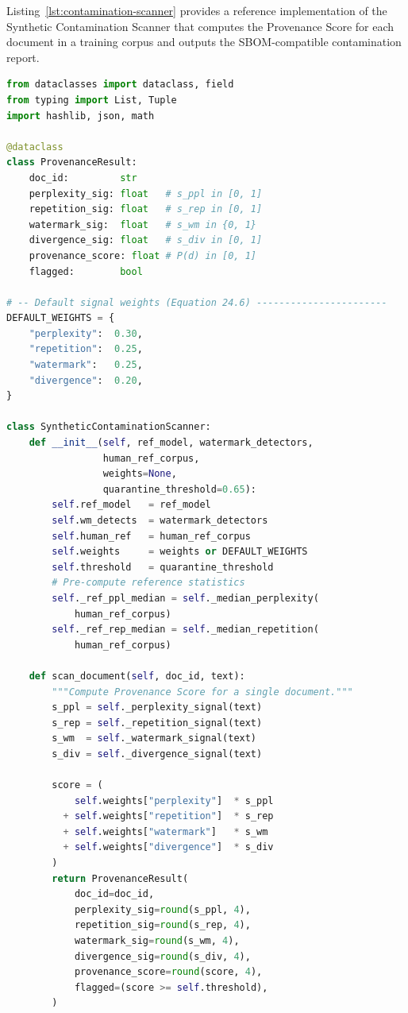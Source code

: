Listing~\ref{lst:contamination-scanner} provides a reference
implementation of the Synthetic Contamination Scanner that
computes the Provenance Score for each document in a training
corpus and outputs the SBOM-compatible contamination report.

\begin{lstlisting}[language=Python, style=pythonstyle,
  caption={Synthetic Contamination Scanner: computes per-document
           Provenance Scores and generates SBOM-compatible
           contamination reports for AI training pipelines.},
  label={lst:contamination-scanner}
]
from dataclasses import dataclass, field
from typing import List, Tuple
import hashlib, json, math

@dataclass
class ProvenanceResult:
    doc_id:         str
    perplexity_sig: float   # s_ppl in [0, 1]
    repetition_sig: float   # s_rep in [0, 1]
    watermark_sig:  float   # s_wm in {0, 1}
    divergence_sig: float   # s_div in [0, 1]
    provenance_score: float # P(d) in [0, 1]
    flagged:        bool

# -- Default signal weights (Equation 24.6) -----------------------
DEFAULT_WEIGHTS = {
    "perplexity":  0.30,
    "repetition":  0.25,
    "watermark":   0.25,
    "divergence":  0.20,
}

class SyntheticContaminationScanner:
    def __init__(self, ref_model, watermark_detectors,
                 human_ref_corpus,
                 weights=None,
                 quarantine_threshold=0.65):
        self.ref_model   = ref_model
        self.wm_detects  = watermark_detectors
        self.human_ref   = human_ref_corpus
        self.weights     = weights or DEFAULT_WEIGHTS
        self.threshold   = quarantine_threshold
        # Pre-compute reference statistics
        self._ref_ppl_median = self._median_perplexity(
            human_ref_corpus)
        self._ref_rep_median = self._median_repetition(
            human_ref_corpus)

    def scan_document(self, doc_id, text):
        """Compute Provenance Score for a single document."""
        s_ppl = self._perplexity_signal(text)
        s_rep = self._repetition_signal(text)
        s_wm  = self._watermark_signal(text)
        s_div = self._divergence_signal(text)

        score = (
            self.weights["perplexity"]  * s_ppl
          + self.weights["repetition"]  * s_rep
          + self.weights["watermark"]   * s_wm
          + self.weights["divergence"]  * s_div
        )
        return ProvenanceResult(
            doc_id=doc_id,
            perplexity_sig=round(s_ppl, 4),
            repetition_sig=round(s_rep, 4),
            watermark_sig=round(s_wm, 4),
            divergence_sig=round(s_div, 4),
            provenance_score=round(score, 4),
            flagged=(score >= self.threshold),
        )


\end{lstlisting}
